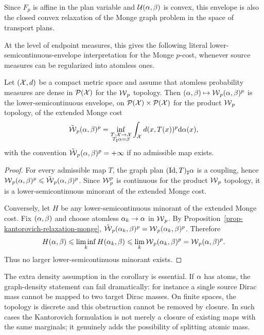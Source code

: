 Since $F_p$ is affine in the plan variable and $\mathcal{U}(\alpha,\beta)$ is convex, this envelope is also the closed convex relaxation of the Monge graph problem in the space of transport plans.

At the level of endpoint measures, this gives the following literal lower-semicontinuous-envelope interpretation for the Monge $p$-cost, whenever source measures can be regularized into atomless ones.

\begin{cor}\label{cor-wasserstein-lsc-envelope-monge-distance}
		Let $(\mathcal{X},d)$ be a compact metric space and assume that atomless probability measures are dense in $\mathcal{P}(\mathcal{X})$ for the $\operatorname{\mathcal{W}}_p$ topology. Then $(\alpha,\beta)\mapsto\operatorname{\mathcal{W}}_p(\alpha,\beta)^p$ is the lower-semicontinuous envelope, on $\mathcal{P}(\mathcal{X})\times\mathcal{P}(\mathcal{X})$ for the product $\operatorname{\mathcal{W}}_p$ topology, of the extended Monge cost
	\[
		\tilde{\operatorname{\mathcal{W}}}_p(\alpha,\beta)^p
		=
		\inf_{\substack{T:\mathcal{X}\to\mathcal{X}\\ T_\sharp\alpha=\beta}}
		\int_{\mathcal{X}} d(x,T(x))^p\mathrm{d}\alpha(x),
	\]
	with the convention $\tilde{\operatorname{\mathcal{W}}}_p(\alpha,\beta)^p=+\infty$ if no admissible map exists.
\end{cor}
\begin{proof}
	For every admissible map $T$, the graph plan $(\mathrm{Id},T)_\sharp\alpha$ is a coupling, hence $\operatorname{\mathcal{W}}_p(\alpha,\beta)^p\leqslant \tilde{\operatorname{\mathcal{W}}}_p(\alpha,\beta)^p$. Since $\operatorname{\mathcal{W}}_p^p$ is continuous for the product $\operatorname{\mathcal{W}}_p$ topology, it is a lower-semicontinuous minorant of the extended Monge cost.

	Conversely, let $H$ be any lower-semicontinuous minorant of the extended Monge cost. Fix $(\alpha,\beta)$ and choose atomless $\alpha_k\to\alpha$ in $\operatorname{\mathcal{W}}_p$. By Proposition~\ref{prop-kantorovich-relaxation-monge}, $\tilde{\operatorname{\mathcal{W}}}_p(\alpha_k,\beta)^p=\operatorname{\mathcal{W}}_p(\alpha_k,\beta)^p$. Therefore
	\[
		H(\alpha,\beta)
		\leqslant
		\liminf_k H(\alpha_k,\beta)
		\leqslant
		\lim_k \operatorname{\mathcal{W}}_p(\alpha_k,\beta)^p
		=
		\operatorname{\mathcal{W}}_p(\alpha,\beta)^p.
	\]
	Thus no larger lower-semicontinuous minorant exists.
\end{proof}

The extra density assumption in the corollary is essential. If $\alpha$ has atoms, the graph-density statement can fail dramatically: for instance a single source Dirac mass cannot be mapped to two target Dirac masses. On finite spaces, the topology is discrete and this obstruction cannot be removed by closure. In such cases the Kantorovich formulation is not merely a closure of existing maps with the same marginals; it genuinely adds the possibility of splitting atomic mass.



